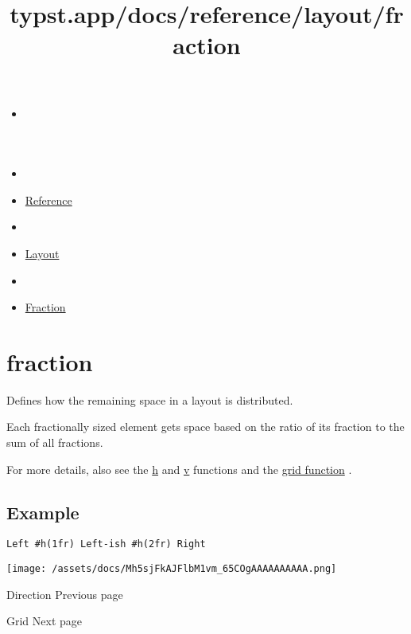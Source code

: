 \title{typst.app/docs/reference/layout/fraction}

\begin{itemize}
\tightlist
\item
  \href{/docs}{}
\item
  
\item
  \href{/docs/reference/}{Reference}
\item
  
\item
  \href{/docs/reference/layout/}{Layout}
\item
  
\item
  \href{/docs/reference/layout/fraction/}{Fraction}
\end{itemize}

\section{\texorpdfstring{{ fraction }}{ fraction }}\label{summary}

Defines how the remaining space in a layout is distributed.

Each fractionally sized element gets space based on the ratio of its
fraction to the sum of all fractions.

For more details, also see the \href{/docs/reference/layout/h/}{h} and
\href{/docs/reference/layout/v/}{v} functions and the
\href{/docs/reference/layout/grid/}{grid function} .

\subsection{Example}\label{example}

\begin{verbatim}
Left #h(1fr) Left-ish #h(2fr) Right
\end{verbatim}

\texttt{[image: /assets/docs/Mh5sjFkAJFlbM1vm\_65COgAAAAAAAAAA.png]}

\href{/docs/reference/layout/direction/}{\pandocbounded{}}

{ Direction } { Previous page }

\href{/docs/reference/layout/grid/}{\pandocbounded{}}

{ Grid } { Next page }
